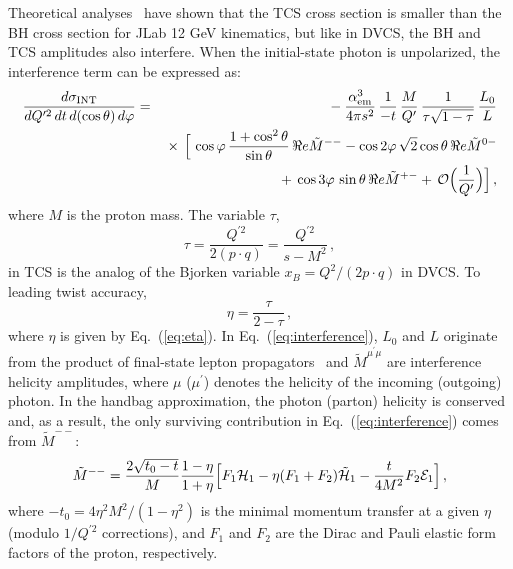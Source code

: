 Theoretical analyses~\cite{Berger:2001xd,Pire:2008ea} have shown that the
TCS cross section is smaller than the BH cross section for JLab 12 GeV
kinematics, but like in DVCS, the BH and TCS amplitudes also interfere.
When the initial-state photon is unpolarized,
the interference term can be expressed as:
\begin{eqnarray}
 \frac{d\sigma_{\rm INT}}{dQ^{\prime 2}\, dt\, d(\cos\theta)\, d\varphi}
&=& {}- \frac{\alpha^3_{\rm em}}{4\pi s^2}\, \frac{1}{-t}\, \frac{M}{Q^{\prime}}\,
 \frac{1}{\tau \sqrt{1-\tau}}\, \frac{L_0}{L}
 \nonumber \\
&& {}\times\, \Big[\, \cos\varphi\, \frac{1+\cos^2\theta}{\sin\theta}\, \Re e \tilde{M}^{--}
   - \cos2\varphi\, \sqrt{2}\cos\theta\, \Re e \tilde{M}^{0-}
 \nonumber \\
&& {}+\, \cos3\varphi\, \sin\theta\, \Re e \tilde{M}^{+-}
   {}+\, {\cal O}\Big( \frac{1}{Q^{\prime}} \Big) \Big] \,,
\label{eq:interference}
\end{eqnarray}
where $M$ is the proton mass. The variable $\tau$,
\begin{equation}
\tau=\frac{Q^{\prime 2}}{2 (p \cdot q)}=\frac{Q^{\prime 2}}{s-M^2} \,,
\label{eq:tau}
\end{equation}
in TCS is the analog of the Bjorken variable $x_B=Q^2/(2 p \cdot q)$ in DVCS. 
To leading twist accuracy,
\begin{equation}
\eta=\frac{\tau}{2-\tau} \,,
\end{equation}   
where $\eta$ is given by Eq.~(\ref{eq:eta}).
In Eq.~(\ref{eq:interference}), $L_0$ and $L$ originate from the product of
final-state lepton propagators~\cite{Berger:2001xd} and
$\tilde{M}^{\mu^{\prime} \mu}$ are interference helicity amplitudes, where
$\mu$ ($\mu^{\prime}$) denotes the helicity of the incoming (outgoing) photon.
In the handbag approximation, the photon (parton) helicity is conserved and,
as a result, the only surviving contribution in Eq.~(\ref{eq:interference})
comes from $\tilde{M}^{--}$:
\begin{equation}
\tilde{M}^{--}=\frac{2 \sqrt{t_0-t}}{M} \frac{1-\eta}{1+\eta} \Big[F_1 {\cal H}_1
-\eta(F_1+F_2)\tilde{{\cal H}}_1-\frac{t}{4 M^2} F_2 {\cal E}_1 \Big] \,,
\label{eq:M}
\end{equation}
where $-t_0=4 \eta^2 M^2/(1-\eta^2)$ is the minimal momentum transfer at a
given $\eta$ (modulo $1/Q^{\prime 2}$ corrections), and $F_1$ and $F_2$ are
the Dirac and Pauli elastic form factors of the proton, respectively.


